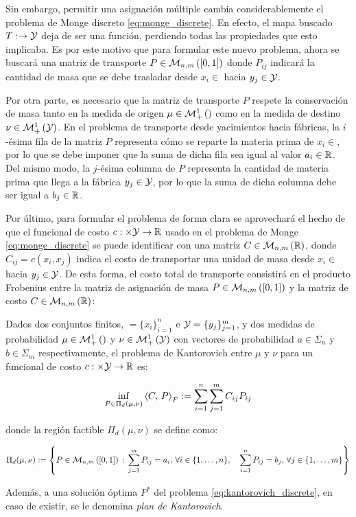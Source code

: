Sin embargo, permitir una asignación múltiple cambia considerablemente el problema de Monge discreto \eqref{eq:monge_discrete}. En efecto, el mapa buscado $T:\to\mathcal{Y}$ deja de ser una función, perdiendo todas las propiedades que esto implicaba. Es por este motivo que para formular este nuevo problema, ahora se buscará una matriz de transporte $P\in\mathcal{M}_{n,m}\left([0,1]\right)$ donde $P_{ij}$ indicará la cantidad de masa que se debe trasladar desde $x_i\in\xspace$ hacia $y_j\in\mathcal{Y}$.

Por otra parte, es necesario que la matriz de transporte $P$ respete la conservación de masa tanto en la medida de origen $\mu\in\mathcal{M}_+^1\left(\right)$ como en la medida de destino $\nu\in\mathcal{M}_+^1\left(\mathcal{Y}\right)$. En el problema de transporte desde yacimientos hacia fábricas, la $i$-ésima fila de la matriz $P$ representa cómo se reparte la materia prima de $x_i\in\xspace$, por lo que se debe imponer que la suma de dicha fila sea igual al valor $a_i\in\mathbb{R}$. Del mismo modo, la $j$-ésima columna de $P$ representa la cantidad de materia prima que llega a la fábrica $y_j\in\mathcal{Y}$, por lo que la suma de dicha columna debe ser igual a $b_j\in\mathbb{R}$.

Por último, para formular el problema de forma clara se aprovechará el hecho de que el funcional de costo $c:\times\mathcal{Y}\to\mathbb{R}$ usado en el problema de Monge \eqref{eq:monge_discrete} se puede identificar con una matriz $C\in\mathcal{M}_{n,m}\left(\mathbb{R}\right)$, donde $C_{ij}=c(x_i,x_j)$ indica el costo de transportar una unidad de masa desde $x_i\in\xspace$ hacia $y_j\in\mathcal{Y}$. De esta forma, el costo total de transporte consistirá en el producto Frobenius entre la matriz de asignación de masa $P\in\mathcal{M}_{n,m}\left([0,1]\right)$ y la matriz de costo $C\in\mathcal{M}_{n,m}\left(\mathbb{R}\right)$:

\begin{defn}
	Dados dos conjuntos finitos, $\xspace=\{x_i\}_{i=1}^n$ e $\mathcal{Y}=\{y_j\}_{j=1}^m$, y dos medidas de probabilidad $\mu\in\mathcal{M}_+^1\left(\right)$ y $\nu\in\mathcal{M}_+^1\left(\mathcal{Y}\right)$ con vectores de probabilidad $a\in\Sigma_n$ y $b\in\Sigma_m$ respectivamente, el problema de Kantorovich entre $\mu$ y $\nu$ para un funcional de costo $c:\times\mathcal{Y}\to\mathbb{R}$ es:

	\begin{equation}
		\label{eq:kantorovich_discrete}
		\inf_{P\in \Pi_d(\mu,\nu)} \left\langle C,\,P\right\rangle_F := \sum_{i=1}^{n}\sum_{j=1}^{m} C_{ij}P_{ij}
	\end{equation}

	donde la región factible $\Pi_d(\mu,\nu)$ se define como:

	\begin{equation*}
		\Pi_d(\mu,\nu) := \left\{P\in\mathcal{M}_{n,m}\left([0,1]\right)\,:\,
		\sum_{j=1}^m P_{ij} = a_i,\, \forall i\in\{1,\ldots,n\},\quad
		\sum_{i=1}^n P_{ij} = b_j,\, \forall j\in\{1,\ldots,m\}
		\right\}
	\end{equation*}

	Además, a una solución óptima $P^*$ del problema \eqref{eq:kantorovich_discrete}, en caso de existir, se le denomina \textit{plan de Kantorovich}.
\end{defn}

